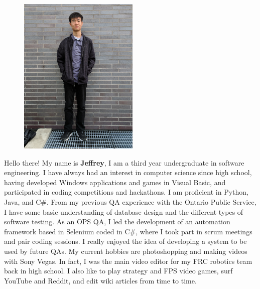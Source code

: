 \documentclass[12pt]{scrreprt}
\begin{document}
\begin{figure} 
	\includegraphics[angle=-90,origin=c,height=3in]{jeff}
\end{figure}
\noindent Hello there! My name is \textbf{Jeffrey}, I am a third year undergraduate in software engineering. I have always had an interest in computer science since high school, having developed Windows applications and games in Visual Basic, and participated in coding competitions and hackathons.  I am proficient in Python, Java, and C\#. From my previous QA experience with the Ontario Public Service, I have some basic understanding of database design and the different types of software testing. As an OPS QA, I led the development of an automation framework based in Selenium coded in C\#, where I took part in scrum meetings and pair coding sessions. I really enjoyed the idea of developing a system to be used by future QAs. My current hobbies are photoshopping and making videos with Sony Vegas. In fact, I was the main video editor for my FRC robotics team back in high school. I also like to play strategy and FPS video games, surf YouTube and Reddit, and edit wiki articles from time to time.
\end{document}
